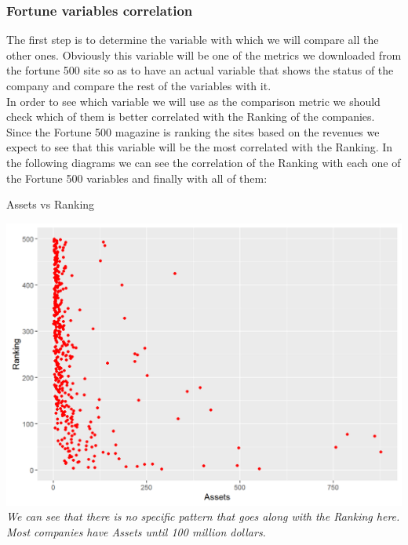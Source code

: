 \documentclass{book}
\begin{document}
\subsubsection{Fortune variables correlation}
The first step is to determine the variable with which we will compare all the other ones. Obviously this variable will be one of the metrics we downloaded from the fortune 500 site so as to have an actual variable that shows the status of the company and compare the rest of the variables with it.\\
In order to see which variable we will use as the comparison metric we should check which of them is better correlated with the Ranking of the companies. Since the Fortune 500 magazine is ranking the sites based on the revenues we expect to see that this variable will be the most correlated with the Ranking. In the following diagrams we can see the correlation of the Ranking with each one of the Fortune 500 variables and finally with all of them:
\begin{table}[H]
\centering
\caption{Assets vs Ranking}
\begin{center}
\includegraphics[scale=0.3]{../R/photos/05_rank_assets.png}  \\
\textit{We can see that there is no specific pattern that goes along with the Ranking here. Most companies have Assets until 100 million dollars.}
\end{center}
\end{table}
\end{document}
